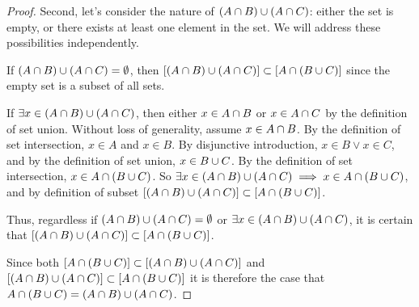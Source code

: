 \documentclass[main.tex]{subfiles}
\begin{document}
\begin{proof}
	\medskip
	Second, let's consider the nature of \((A \cap B) \cup (A \cap C)\):
	either the set is empty, or there exists at least one element in the
	set. We will address these possibilities independently.

	If \((A \cap B) \cup (A \cap C) = \emptyset\), then
	\([(A \cap B) \cup (A \cap C)] \subset [A \cap (B \cup C)]\) since the
	empty set is a subset of all sets.

	If \(\exists x \in (A \cap B) \cup (A \cap C)\), then either
	\(x \in A \cap B\) or \(x \in A \cap C\) by the definition of set union.
	Without loss of generality, assume \(x \in A \cap B\). By the definition
	of set intersection, \(x \in A\) and \(x \in B\). By disjunctive
	introduction, \(x \in B \lor x \in C\), and by the definition of set
	union, \(x \in B \cup C\). By the definition of set intersection,
	\(x \in A \cap (B \cup C)\). So
	\(\exists x \in (A \cap B) \cup (A \cap C) \implies x \in A \cap (B \cup C)\),
	and by definition of subset
	\([(A \cap B) \cup (A \cap C)] \subset [A \cap (B \cup C)]\).

	Thus, regardless if \((A \cap B) \cup (A \cap C) = \emptyset\) or
	\(\exists x \in (A \cap B) \cup (A \cap C)\), it is certain that
	\([(A \cap B) \cup (A \cap C)] \subset [A \cap (B \cup C)]\).

	\medskip
	Since both
	\([A \cap (B \cup C)] \subset [(A \cap B) \cup (A \cap C)]\) and
	\([(A \cap B) \cup (A \cap C)] \subset [A \cap (B \cup C)]\) it is
	therefore the case that
	\(A \cap (B \cup C) = (A \cap B) \cup (A \cap C)\).
\end{proof}

\bigbreak{}
\end{document}
